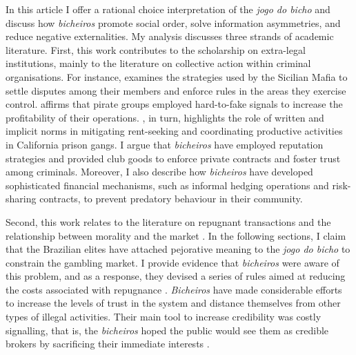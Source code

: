 In this article I offer a rational choice interpretation of the \emph{jogo do bicho} and discuss how \emph{bicheiros} promote social order, solve information asymmetries, and reduce negative externalities. My analysis discusses three strands of academic literature. First, this work contributes to the scholarship on extra-legal institutions, mainly to the literature on collective action within criminal organisations. For instance, \citet{gambetta1996sicilian} examines the strategies used by the Sicilian Mafia to settle disputes among their members and enforce rules in the areas they exercise control. \citet{leeson2007arrgh,leeson2009invisible,leeson2010pirational} affirms that pirate groups employed hard-to-fake signals to increase the profitability of their operations. \citet{skarbek2011governance,skarbek2012prison,skarbek2014social}, in turn, highlights the role of written and implicit norms in mitigating rent-seeking and coordinating productive activities in California prison gangs. I argue that \emph{bicheiros} have employed reputation strategies and provided club goods to enforce private contracts and foster trust among criminals. Moreover, I also describe how \emph{bicheiros} have developed sophisticated financial mechanisms, such as informal hedging operations and risk-sharing contracts, to prevent predatory behaviour in their community.

Second, this work relates to the literature on repugnant transactions and the relationship between morality and the market \citep{boettke1995morality, roth2007repugnance, sandel2012money, satz2010some, simmel1900geldes, zelizer1979morals}. In the following sections, I claim that the Brazilian elites have attached pejorative meaning to the \emph{jogo do bicho} to constrain the gambling market. I provide evidence that \emph{bicheiros} were aware of this problem, and as a response, they devised a series of rules aimed at reducing the costs associated with repugnance \citep{labronici2014sorteio, magalhaes2005ganhou}. \emph{Bicheiros} have made considerable efforts to increase the levels of trust in the system and distance themselves from other types of illegal activities. Their main tool to increase credibility was costly signalling, that is, the \emph{bicheiros} hoped the public would see them as credible brokers by sacrificing their immediate interests  \citep{gambetta2009codes,kimbrough2015commitment, schelling1960strategy}.

